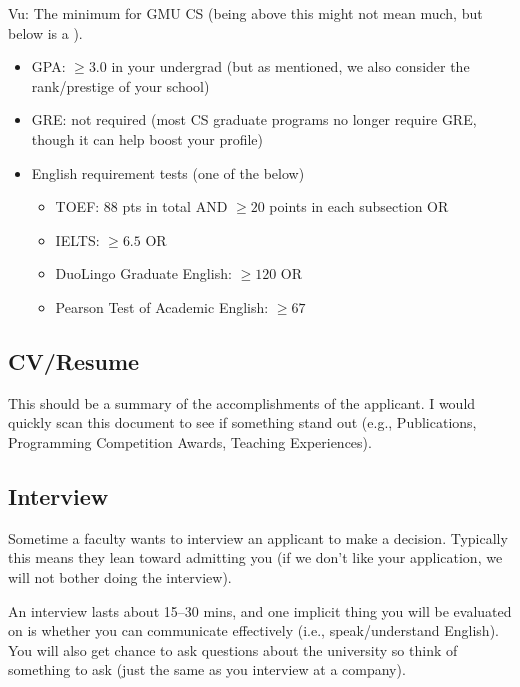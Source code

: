 \documentclass[10pt]{article}
\newcommand{\red}[1]{{\color{red}{#1}}}
\begin{document}
\begin{tcolorbox}[left=1pt,right=1pt,top=1pt,bottom=1pt]
Vu: The minimum for GMU CS (being above this might not mean much, but below is a \red{red flag}).
\begin{itemize}
\item GPA: $\ge 3.0$ in your undergrad (but as mentioned, we also consider the rank/prestige of your school)
\item GRE: not required (most CS graduate programs no longer require GRE, though it can help boost your profile)
\item English requirement tests (one of the below)
  \begin{itemize}    
  \item TOEF: 88 pts in total AND $\ge 20$ points in each subsection OR
  \item IELTS: $\ge 6.5$ OR
  \item DuoLingo Graduate English: $\ge 120$ OR 
  \item Pearson Test of Academic English: $\ge 67$
  \end{itemize}  
\end{itemize}
\end{tcolorbox}


\subsection{CV/Resume}
This should be a summary of the accomplishments of the applicant.  I would quickly scan this document to see if something stand out (e.g., Publications, Programming Competition Awards, Teaching Experiences).

\subsection{Interview}

Sometime a faculty wants to interview an applicant to make a decision. Typically this means they lean toward admitting you (if we don't like your application, we will not bother doing the interview).

An interview lasts about 15--30 mins, and one implicit thing you will be evaluated on is whether you can communicate effectively (i.e., speak/understand English).  You will also get chance to ask questions about the university so think of something to ask (just the same as you interview at a company).
\end{document}
